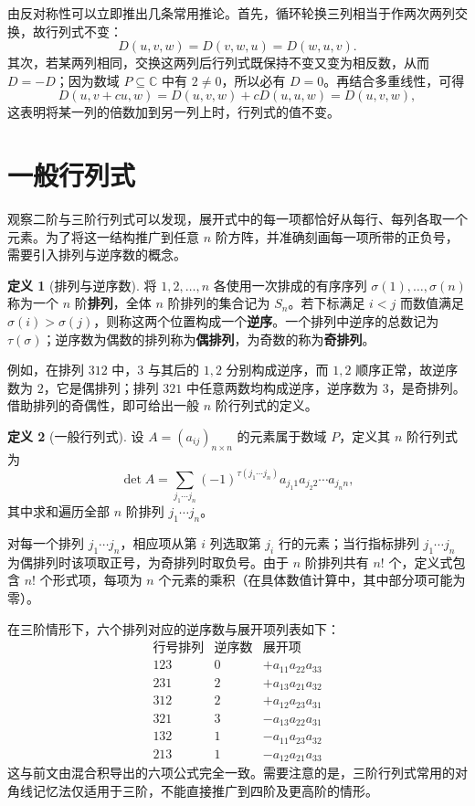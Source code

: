 \documentclass[UTF8, fontset=fandol, a4paper, 12pt]{ctexart}
\newcommand{\C}{\mathbb{C}}
\theoremstyle{definition}
\newtheorem{definition}{定义}[section]
\begin{document}
由反对称性可以立即推出几条常用推论。首先，循环轮换三列相当于作两次两列交换，故行列式不变：
\[
D(u,v,w)=D(v,w,u)=D(w,u,v).
\]
其次，若某两列相同，交换这两列后行列式既保持不变又变为相反数，从而 $D=-D$；因为数域 $P\subseteq\C$ 中有 $2\ne0$，所以必有 $D=0$。再结合多重线性，可得
\[
D(u,v+cu,w)=D(u,v,w)+cD(u,u,w)=D(u,v,w),
\]
这表明将某一列的倍数加到另一列上时，行列式的值不变。

\section{一般行列式}

观察二阶与三阶行列式可以发现，展开式中的每一项都恰好从每行、每列各取一个元素。为了将这一结构推广到任意 $n$ 阶方阵，并准确刻画每一项所带的正负号，需要引入排列与逆序数的概念。

\begin{definition}[排列与逆序数]
将 $1,2,\ldots,n$ 各使用一次排成的有序序列 $\sigma(1),\ldots,\sigma(n)$ 称为一个 $n$ 阶\textbf{排列}，全体 $n$ 阶排列的集合记为 $S_n$。若下标满足 $i<j$ 而数值满足 $\sigma(i)>\sigma(j)$，则称这两个位置构成一个\textbf{逆序}。一个排列中逆序的总数记为 $\tau(\sigma)$；逆序数为偶数的排列称为\textbf{偶排列}，为奇数的称为\textbf{奇排列}。
\end{definition}

例如，在排列 $312$ 中，$3$ 与其后的 $1,2$ 分别构成逆序，而 $1,2$ 顺序正常，故逆序数为 $2$，它是偶排列；排列 $321$ 中任意两数均构成逆序，逆序数为 $3$，是奇排列。借助排列的奇偶性，即可给出一般 $n$ 阶行列式的定义。

\begin{definition}[一般行列式]
设 $A=(a_{ij})_{n\times n}$ 的元素属于数域 $P$，定义其 $n$ 阶行列式为
\[
\det A=\sum_{j_1\cdots j_n}(-1)^{\tau(j_1\cdots j_n)}
  a_{j_1 1}a_{j_2 2}\cdots a_{j_n n},
\]
其中求和遍历全部 $n$ 阶排列 $j_1\cdots j_n$。
\end{definition}

对每一个排列 $j_1\cdots j_n$，相应项从第 $i$ 列选取第 $j_i$ 行的元素；当行指标排列 $j_1\cdots j_n$ 为偶排列时该项取正号，为奇排列时取负号。由于 $n$ 阶排列共有 $n!$ 个，定义式包含 $n!$ 个形式项，每项为 $n$ 个元素的乘积（在具体数值计算中，其中部分项可能为零）。

在三阶情形下，六个排列对应的逆序数与展开项列表如下：
\[
\begin{array}{c|c|c}
\text{行号排列}&\text{逆序数}&\text{展开项}\\\hline
123&0&+a_{11}a_{22}a_{33}\\
231&2&+a_{13}a_{21}a_{32}\\
312&2&+a_{12}a_{23}a_{31}\\
321&3&-a_{13}a_{22}a_{31}\\
132&1&-a_{11}a_{23}a_{32}\\
213&1&-a_{12}a_{21}a_{33}
\end{array}
\]
这与前文由混合积导出的六项公式完全一致。需要注意的是，三阶行列式常用的对角线记忆法仅适用于三阶，不能直接推广到四阶及更高阶的情形。
\end{document}
